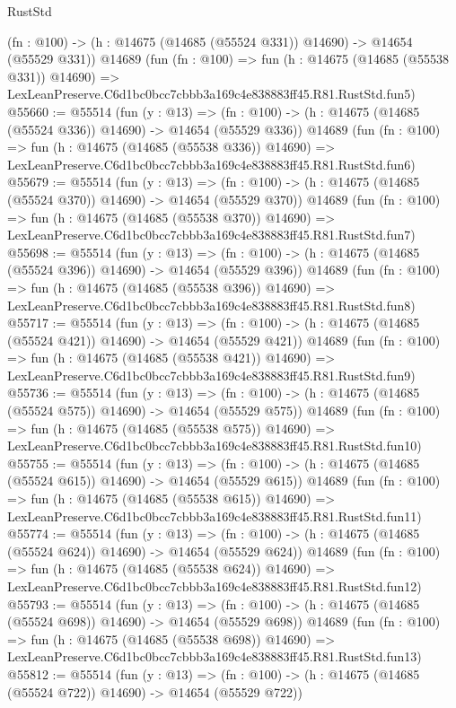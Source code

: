 \begin{lexlean}{RustStd}
\begin{coremodule}
    (fn : @100) -> (h : @14675 (@14685 (@55524 @331)) @14690) -> @14654 (@55529 @331))
    @14689
    (fun (fn : @100) =>
    fun (h : @14675 (@14685 (@55538 @331)) @14690) =>
    LexLeanPreserve.C6d1bc0bcc7cbbb3a169c4e838883ff45.R81.RustStd.fun5)
@55660 := @55514
    (fun (y : @13) =>
    (fn : @100) -> (h : @14675 (@14685 (@55524 @336)) @14690) -> @14654 (@55529 @336))
    @14689
    (fun (fn : @100) =>
    fun (h : @14675 (@14685 (@55538 @336)) @14690) =>
    LexLeanPreserve.C6d1bc0bcc7cbbb3a169c4e838883ff45.R81.RustStd.fun6)
@55679 := @55514
    (fun (y : @13) =>
    (fn : @100) -> (h : @14675 (@14685 (@55524 @370)) @14690) -> @14654 (@55529 @370))
    @14689
    (fun (fn : @100) =>
    fun (h : @14675 (@14685 (@55538 @370)) @14690) =>
    LexLeanPreserve.C6d1bc0bcc7cbbb3a169c4e838883ff45.R81.RustStd.fun7)
@55698 := @55514
    (fun (y : @13) =>
    (fn : @100) -> (h : @14675 (@14685 (@55524 @396)) @14690) -> @14654 (@55529 @396))
    @14689
    (fun (fn : @100) =>
    fun (h : @14675 (@14685 (@55538 @396)) @14690) =>
    LexLeanPreserve.C6d1bc0bcc7cbbb3a169c4e838883ff45.R81.RustStd.fun8)
@55717 := @55514
    (fun (y : @13) =>
    (fn : @100) -> (h : @14675 (@14685 (@55524 @421)) @14690) -> @14654 (@55529 @421))
    @14689
    (fun (fn : @100) =>
    fun (h : @14675 (@14685 (@55538 @421)) @14690) =>
    LexLeanPreserve.C6d1bc0bcc7cbbb3a169c4e838883ff45.R81.RustStd.fun9)
@55736 := @55514
    (fun (y : @13) =>
    (fn : @100) -> (h : @14675 (@14685 (@55524 @575)) @14690) -> @14654 (@55529 @575))
    @14689
    (fun (fn : @100) =>
    fun (h : @14675 (@14685 (@55538 @575)) @14690) =>
    LexLeanPreserve.C6d1bc0bcc7cbbb3a169c4e838883ff45.R81.RustStd.fun10)
@55755 := @55514
    (fun (y : @13) =>
    (fn : @100) -> (h : @14675 (@14685 (@55524 @615)) @14690) -> @14654 (@55529 @615))
    @14689
    (fun (fn : @100) =>
    fun (h : @14675 (@14685 (@55538 @615)) @14690) =>
    LexLeanPreserve.C6d1bc0bcc7cbbb3a169c4e838883ff45.R81.RustStd.fun11)
@55774 := @55514
    (fun (y : @13) =>
    (fn : @100) -> (h : @14675 (@14685 (@55524 @624)) @14690) -> @14654 (@55529 @624))
    @14689
    (fun (fn : @100) =>
    fun (h : @14675 (@14685 (@55538 @624)) @14690) =>
    LexLeanPreserve.C6d1bc0bcc7cbbb3a169c4e838883ff45.R81.RustStd.fun12)
@55793 := @55514
    (fun (y : @13) =>
    (fn : @100) -> (h : @14675 (@14685 (@55524 @698)) @14690) -> @14654 (@55529 @698))
    @14689
    (fun (fn : @100) =>
    fun (h : @14675 (@14685 (@55538 @698)) @14690) =>
    LexLeanPreserve.C6d1bc0bcc7cbbb3a169c4e838883ff45.R81.RustStd.fun13)
@55812 := @55514
    (fun (y : @13) =>
    (fn : @100) -> (h : @14675 (@14685 (@55524 @722)) @14690) -> @14654 (@55529 @722))

\end{coremodule}
\end{lexlean}
